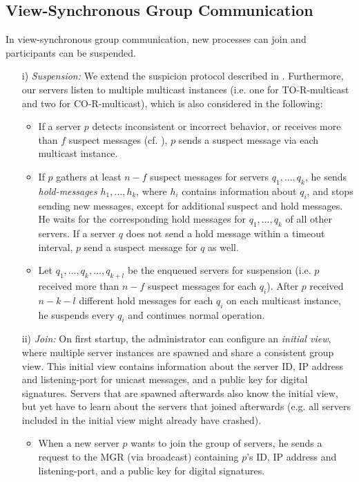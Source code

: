 \documentclass[runningheads]{llncs}
\begin{document}
\subsection{View-Synchronous Group Communication} \label{sec:view_sync_comm}
In view-synchronous group communication, new processes can join and participants can be suspended. 
\begin{enumerate}
    \item[i)] \textit{Suspension:} We extend the suspicion protocol described in . Furthermore, our servers listen to multiple multicast instances (i.e. one for TO-R-multicast and two for CO-R-multicast), which is also considered in the following: 
    \begin{itemize}
        \item If a server $p$ detects inconsistent or incorrect behavior, or receives more than $f$ suspect messages (cf. ), $p$ sends a suspect message via each multicast instance.
        \item If $p$ gathers at least $n-f$ suspect messages for servers $q_1, \ldots, q_k$, he sends \textit{hold-messages} $h_1, \ldots, h_k$, where $h_i$ contains information about $q_i$, and stops sending new messages, except for additional suspect and hold messages. He waits for the corresponding hold messages for $q_1, \ldots, q_k$ of all other servers. If a server $q$ does not send a hold message within a timeout interval, $p$ send a suspect message for $q$ as well. 
        \item Let $q_1, \ldots, q_k, \ldots, q_{k+l}$ be the enqueued servers for suspension (i.e. $p$ received more than $n-f$ suspect messages for each $q_i$). After $p$ received $n-k-l$ different hold messages for each $q_i$ on each multicast instance, he suspends every $q_i$ and continues normal operation.
    \end{itemize} 
    \item[ii)] \textit{Join:} On first startup, the administrator can configure an \textit{initial view}, where multiple server instances are spawned and share a consistent group view. This initial view contains information about the server ID, IP address and listening-port for unicast messages, and a public key for digital signatures. Servers that are spawned afterwards also know the initial view, but yet have to learn about the servers that joined afterwards (e.g. all servers included in the initial view might already have crashed). 
    \begin{itemize}
        \item When a new server $p$ wants to join the group of servers, he sends a request to the MGR (via broadcast) containing $p$'s ID, IP address and listening-port, and a public key for digital signatures.

\end{itemize}
\end{enumerate}
\end{document}
